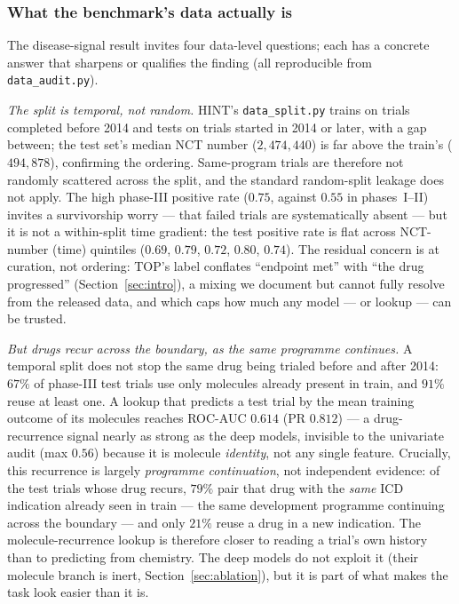 \documentclass[a4paper,fleqn]{cas-sc}
\begin{document}
\subsubsection{What the benchmark's data actually is}
\label{sec:dataquality}
The disease-signal result invites four data-level questions; each has a concrete answer that
sharpens or qualifies the finding (all reproducible from \texttt{data\_audit.py}).

\emph{The split is temporal, not random.} HINT's \texttt{data\_split.py} trains on trials
completed before 2014 and tests on trials started in 2014 or later, with a gap between; the
test set's median NCT number ($2{,}474{,}440$) is far above the train's ($494{,}878$),
confirming the ordering. Same-program trials are therefore not randomly scattered across the
split, and the standard random-split leakage does not apply. The high phase-III positive rate
($0.75$, against $0.55$ in phases~I--II) invites a survivorship worry --- that failed trials are
systematically absent --- but it is not a within-split time gradient: the test positive rate is
flat across NCT-number (time) quintiles ($0.69$, $0.79$, $0.72$, $0.80$, $0.74$). The residual
concern is at curation, not ordering: TOP's label conflates ``endpoint met'' with ``the drug
progressed'' (Section~\ref{sec:intro}), a mixing we document but cannot fully resolve from the
released data, and which caps how much any model --- or lookup --- can be trusted.

\emph{But drugs recur across the boundary, as the same programme continues.} A temporal split
does not stop the same drug being trialed before and after 2014: $67\%$ of phase-III test trials
use only molecules already present in train, and $91\%$ reuse at least one. A lookup that
predicts a test trial by the mean training outcome of its molecules reaches ROC-AUC $0.614$
(PR $0.812$) --- a drug-recurrence signal nearly as strong as the deep models, invisible to the
univariate audit (max $0.56$) because it is molecule \emph{identity}, not any single feature.
Crucially, this recurrence is largely \emph{programme continuation}, not independent evidence:
of the test trials whose drug recurs, $79\%$ pair that drug with the \emph{same} ICD indication
already seen in train --- the same development programme continuing across the boundary --- and
only $21\%$ reuse a drug in a new indication. The molecule-recurrence lookup is therefore closer
to reading a trial's own history than to predicting from chemistry. The deep models do not
exploit it (their molecule branch is inert, Section~\ref{sec:ablation}), but it is part of what
makes the task look easier than it is.
\end{document}
